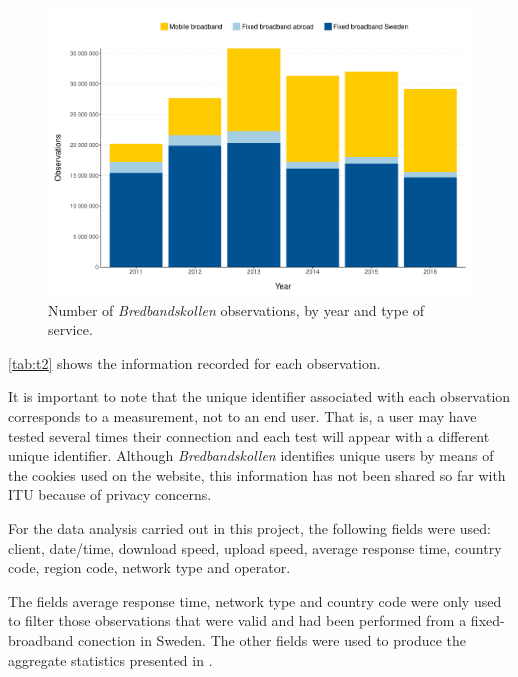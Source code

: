 \documentclass[12pt]{article}
\begin{document}
\begin{figure}[H]
    \centering
        \includegraphics[width=0.95\linewidth]{Observations_year.pdf}
        \caption{Number of \textit{Bredbandskollen} observations, by year and type of service.}
        \label{fig:a5}
\end{figure}   

\autoref{tab:t2} shows the information recorded for each observation. 
 
It is important to note that the unique identifier associated with each observation corresponds to a measurement, not to an end user. That is, a user may have tested several times their connection and each test will appear with a different unique identifier. Although \textit{Bredbandskollen} identifies unique users by means of the cookies used on the website, this information has not been shared so far with ITU because of privacy concerns.

For the data analysis carried out in this project, the following fields were used: client, date/time, download speed, upload speed, average response time, country code, region code, network type and operator.

The fields average response time, network type and country code were only used to filter those observations that were valid and had been performed from a fixed-broadband conection in Sweden. The other fields were used to produce the aggregate statistics presented in . 
   
\end{document}
